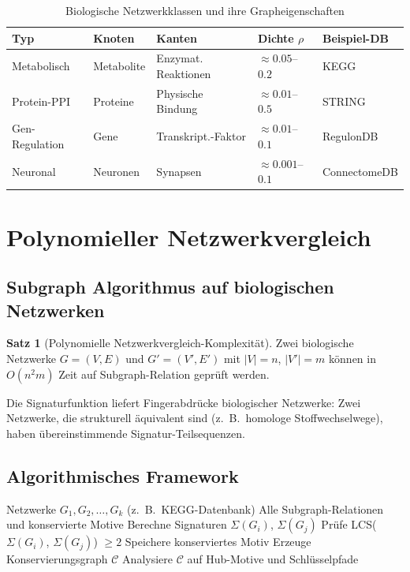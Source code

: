﻿\documentclass[a4paper,12pt]{scrreprt}
\theoremstyle{definition}
\newtheorem{satz}{Satz}[section]
\begin{document}
\begin{table}[H]
\caption{Biologische Netzwerkklassen und ihre Grapheigenschaften}
\label{tab:nf4_netze}
\begin{tabular}{lllll}
\toprule
\textbf{Typ} & \textbf{Knoten} & \textbf{Kanten} & \textbf{Dichte $\rho$} & \textbf{Beispiel-DB} \\
\midrule
Metabolisch    & Metabolite & Enzymat. Reaktionen & $\approx 0.05$--$0.2$ & KEGG \\
Protein-PPI    & Proteine   & Physische Bindung   & $\approx 0.01$--$0.5$ & STRING \\
Gen-Regulation & Gene       & Transkript.-Faktor  & $\approx 0.01$--$0.1$ & RegulonDB \\
Neuronal       & Neuronen   & Synapsen            & $\approx 0.001$--$0.1$ & ConnectomeDB \\
\bottomrule
\end{tabular}
\end{table}

\section{Polynomieller Netzwerkvergleich}

\subsection{Subgraph Algorithmus auf biologischen Netzwerken}

\begin{satz}[Polynomielle Netzwerkvergleich-Komplexität]
  Zwei biologische Netzwerke $G=(V,E)$ und $G'=(V',E')$ mit
  $|V|=n$, $|V'|=m$ können in $O(n^2 m)$ Zeit auf Subgraph-Relation
  geprüft werden.
\end{satz}

Die Signaturfunktion liefert Fingerabdrücke biologischer Netzwerke:
Zwei Netzwerke, die strukturell äquivalent sind (z.\ B.\ homologe
Stoffwechselwege), haben übereinstimmende Signatur-Teilsequenzen.

\subsection{Algorithmisches Framework}

\begin{algorithm}[H]
\caption{Polynomielle biologische Netzwerkanalyse}
\label{alg:nf4}
\begin{algorithmic}[1]
\Require Netzwerke $G_1, G_2, \ldots, G_k$ (z.\ B.\ KEGG-Datenbank)
\Ensure Alle Subgraph-Relationen und konservierte Motive
  \State Berechne Signaturen $\Sigma(G_i)$, $\Sigma(G_j)$
  \State Prüfe LCS($\Sigma(G_i)$, $\Sigma(G_j)$) $\geq 2$
    \State Speichere konserviertes Motiv
  \EndIf
\EndFor
\State Erzeuge Konservierungsgraph $\mathcal{C}$
\State Analysiere $\mathcal{C}$ auf Hub-Motive und Schlüsselpfade
\end{algorithmic}
\end{algorithm}
\end{document}
